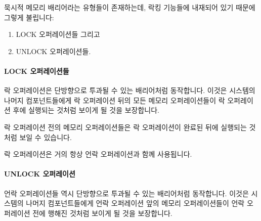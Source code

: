 \begin{enumerate}
묵시적 메모리 배리어라는 유형들이 존재하는데, 락킹 기능들에 내재되어 있기
때문에 그렇게 불립니다:

\begin{enumerate}
\item	LOCK 오퍼레이션들 그리고
\item	UNLOCK 오퍼레이션들.
\end{enumerate}

\paragraph{LOCK 오퍼레이션들}

락 오퍼레이션은 단방향으로 투과될 수 있는 배리어처럼 동작합니다.
이것은 시스템의 나머지 컴포넌트들에게 락 오퍼레이션 뒤의 모든 메모리
오퍼레이션들이 락 오퍼레이션 후에 실행되는 것처럼 보이게 될 것을 보장합니다.

락 오퍼레이션 전의 메모리 오퍼레이션들은 락 오퍼레이션이 완료된 뒤에 실행되는
것처럼 보일 수 있습니다.

락 오퍼레이션은 거의 항상 언락 오퍼레이션과 함께 사용됩니다.

\paragraph{UNLOCK 오퍼레이션}

언락 오퍼레이션들 역시 단방향으로 투과될 수 있는 배리어처럼 동작합니다.
이것은 시스템의 나머지 컴포넌트들에게 언락 오퍼레이션 앞의 메모리
오퍼레이션들이 언락 오퍼레이션 전에 행해진 것처럼 보이게 될 것을 보장합니다.


\end{enumerate}
